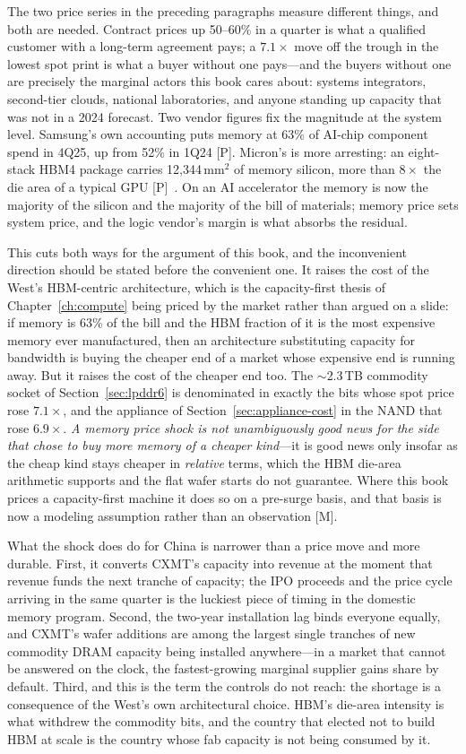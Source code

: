 The two price series in the preceding paragraphs measure different things, and both are needed. Contract prices up 50--60\% in a quarter is what a qualified customer with a long-term agreement pays; a $7.1\times$ move off the trough in the lowest spot print is what a buyer without one pays---and the buyers without one are precisely the marginal actors this book cares about: systems integrators, second-tier clouds, national laboratories, and anyone standing up capacity that was not in a 2024 forecast. Two vendor figures fix the magnitude at the system level. Samsung's own accounting puts memory at 63\% of AI-chip component spend in 4Q25, up from 52\% in 1Q24 [P]. Micron's is more arresting: an eight-stack HBM4 package carries 12{,}344\,mm$^2$ of memory silicon, more than $8\times$ the die area of a typical GPU [P]~\cite{hc2026-hbm4-spread}. On an AI accelerator the memory is now the majority of the silicon and the majority of the bill of materials; memory price sets system price, and the logic vendor's margin is what absorbs the residual.

This cuts both ways for the argument of this book, and the inconvenient direction should be stated before the convenient one. It raises the cost of the West's HBM-centric architecture, which is the capacity-first thesis of Chapter~\ref{ch:compute} being priced by the market rather than argued on a slide: if memory is 63\% of the bill and the HBM fraction of it is the most expensive memory ever manufactured, then an architecture substituting capacity for bandwidth is buying the cheaper end of a market whose expensive end is running away. But it raises the cost of the cheaper end too. The ${\sim}$2.3\,TB commodity socket of Section~\ref{sec:lpddr6} is denominated in exactly the bits whose spot price rose $7.1\times$, and the appliance of Section~\ref{sec:appliance-cost} in the NAND that rose $6.9\times$. \emph{A memory price shock is not unambiguously good news for the side that chose to buy more memory of a cheaper kind}---it is good news only insofar as the cheap kind stays cheaper in \emph{relative} terms, which the HBM die-area arithmetic supports and the flat wafer starts do not guarantee. Where this book prices a capacity-first machine it does so on a pre-surge basis, and that basis is now a modeling assumption rather than an observation [M].

What the shock does do for China is narrower than a price move and more durable. First, it converts CXMT's capacity into revenue at the moment that revenue funds the next tranche of capacity; the IPO proceeds and the price cycle arriving in the same quarter is the luckiest piece of timing in the domestic memory program. Second, the two-year installation lag binds everyone equally, and CXMT's wafer additions are among the largest single tranches of new commodity DRAM capacity being installed anywhere---in a market that cannot be answered on the clock, the fastest-growing marginal supplier gains share by default. Third, and this is the term the controls do not reach: the shortage is a consequence of the West's own architectural choice. HBM's die-area intensity is what withdrew the commodity bits, and the country that elected not to build HBM at scale is the country whose fab capacity is not being consumed by it.

